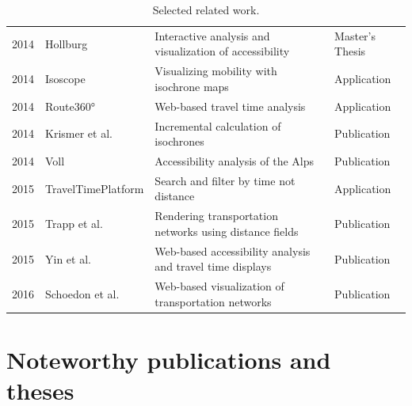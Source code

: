 \begin{table}[htp]
\begin{tabular}{r|l|l|l}
      2014 & Hollburg \cite{Hollburg2014} & Interactive analysis and visualization of accessibility & Master's Thesis  \\
      2014 & Isoscope \cite{Isoscope} & Visualizing mobility with isochrone maps  & Application  \\
      2014 & Route360° \cite{Route360} & Web-based travel time analysis  & Application  \\
      2014 & Krismer et al. \cite{krismer2014incremental} & Incremental calculation of isochrones  & Publication  \\
      2014 & Voll \cite{vollerreichbarkeiten} & Accessibility analysis of the Alps  & Publication  \\
      2015 & TravelTimePlatform \cite{TravelTimePlatform} & Search and filter by time not distance  & Application  \\
      2015 & Trapp et al. \cite{Trapp2015} & Rendering transportation networks using distance fields & Publication \\
      2015 & Yin et al. \cite{Yin2015} & Web-based accessibility analysis and travel time displays  & Publication  \\
      2016 & Schoedon et al. \cite{STHD2016} & Web-based visualization of transportation networks  & Publication  \\
    \end{tabular}
    \caption{Selected related work.}
    \label{tab:overv:relat}
  \end{table}

  \section{Noteworthy publications and theses}
    \label{sec:overv:publc}

